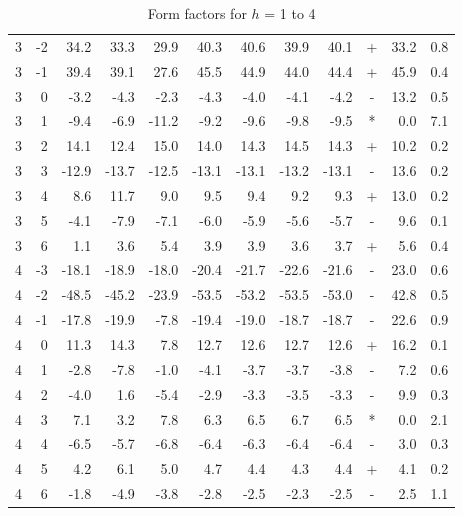 \begin{table}[htbp]
\begin{tabular}{rrrrrrrrrcrr}
3 & -2 &  34.2 &  33.3 &  29.9 &  40.3 &   40.6 &  39.9 &   40.1 & + & 33.2 & 0.8 \\ 
3 & -1 &  39.4 &  39.1 &  27.6 &  45.5 &   44.9 &  44.0 &   44.4 & + & 45.9 & 0.4 \\ 
3 &  0 &  -3.2 &  -4.3 &  -2.3 &  -4.3 &   -4.0 &  -4.1 &   -4.2 & - & 13.2 & 0.5 \\ 
3 &  1 &  -9.4 &  -6.9 & -11.2 &  -9.2 &   -9.6 &  -9.8 &   -9.5 & * & 0.0 & 7.1 \\ 
3 &  2 &  14.1 &  12.4 &  15.0 &  14.0 &   14.3 &  14.5 &   14.3 & + & 10.2 & 0.2 \\ 
3 &  3 & -12.9 & -13.7 & -12.5 & -13.1 &  -13.1 & -13.2 &  -13.1 & - & 13.6 & 0.2 \\ 
3 &  4 &   8.6 &  11.7 &   9.0 &   9.5 &    9.4 &   9.2 &    9.3 & + & 13.0 & 0.2 \\ 
3 &  5 &  -4.1 &  -7.9 &  -7.1 &  -6.0 &   -5.9 &  -5.6 &   -5.7 & - & 9.6 & 0.1 \\ 
3 &  6 &   1.1 &   3.6 &   5.4 &   3.9 &    3.9 &   3.6 &    3.7 & + & 5.6 & 0.4 \\ 
4 & -3 & -18.1 & -18.9 & -18.0 & -20.4 &  -21.7 & -22.6 &  -21.6 & - & 23.0 & 0.6 \\ 
4 & -2 & -48.5 & -45.2 & -23.9 & -53.5 &  -53.2 & -53.5 &  -53.0 & - & 42.8 & 0.5 \\ 
4 & -1 & -17.8 & -19.9 &  -7.8 & -19.4 &  -19.0 & -18.7 &  -18.7 & - & 22.6 & 0.9 \\ 
4 &  0 &  11.3 &  14.3 &   7.8 &  12.7 &   12.6 &  12.7 &   12.6 & + & 16.2 & 0.1 \\ 
4 &  1 &  -2.8 &  -7.8 &  -1.0 &  -4.1 &   -3.7 &  -3.7 &   -3.8 & - & 7.2 & 0.6 \\ 
4 &  2 &  -4.0 &   1.6 &  -5.4 &  -2.9 &   -3.3 &  -3.5 &   -3.3 & - & 9.9 & 0.3 \\ 
4 &  3 &   7.1 &   3.2 &   7.8 &   6.3 &    6.5 &   6.7 &    6.5 & * & 0.0 & 2.1 \\ 
4 &  4 &  -6.5 &  -5.7 &  -6.8 &  -6.4 &   -6.3 &  -6.4 &   -6.4 & - & 3.0 & 0.3 \\ 
4 &  5 &   4.2 &   6.1 &   5.0 &   4.7 &    4.4 &   4.3 &    4.4 & + & 4.1 & 0.2 \\ 
4 &  6 &  -1.8 &  -4.9 &  -3.8 &  -2.8 &   -2.5 &  -2.3 &   -2.5 & - & 2.5 & 1.1 \\ 
\hline
\end{tabular}
  \caption{Form factors for $h$ = 1 to 4}
  \label{tab:LAXS_fits1}
\end{table}

